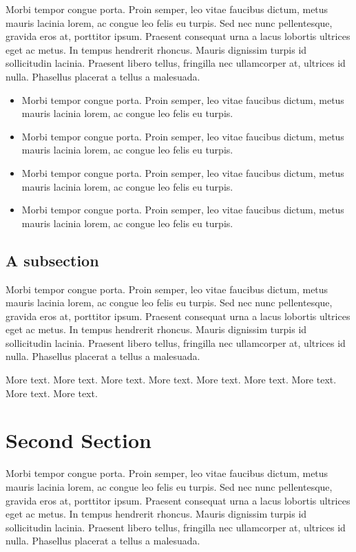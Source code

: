 \documentclass[11pt,titlepage,twoside,openright]{report}
\begin{document}
Morbi tempor congue porta. Proin semper, leo vitae faucibus dictum, metus mauris lacinia lorem, ac congue leo felis eu turpis. Sed nec nunc pellentesque, gravida eros at, porttitor ipsum. Praesent consequat urna a lacus lobortis ultrices eget ac metus. In tempus hendrerit rhoncus. Mauris dignissim turpis id sollicitudin lacinia. Praesent libero tellus, fringilla nec ullamcorper at, ultrices id nulla. Phasellus placerat a tellus a malesuada.

\begin{itemize}
	\item Morbi tempor congue porta. Proin semper, leo vitae faucibus dictum, metus mauris lacinia lorem, ac congue leo felis eu turpis. 
	\item Morbi tempor congue porta. Proin semper, leo vitae faucibus dictum, metus mauris lacinia lorem, ac congue leo felis eu turpis. 
	\item Morbi tempor congue porta. Proin semper, leo vitae faucibus dictum, metus mauris lacinia lorem, ac congue leo felis eu turpis. 
	\item Morbi tempor congue porta. Proin semper, leo vitae faucibus dictum, metus mauris lacinia lorem, ac congue leo felis eu turpis. 
\end{itemize}

\subsection[1st Subsection Name]{A subsection}

Morbi tempor congue porta. Proin semper, leo vitae faucibus dictum, metus mauris lacinia lorem, ac congue leo felis eu turpis. Sed nec nunc pellentesque, gravida eros at, porttitor ipsum. Praesent consequat urna a lacus lobortis ultrices eget ac metus. In tempus hendrerit rhoncus. Mauris dignissim turpis id sollicitudin lacinia. Praesent libero tellus, fringilla nec ullamcorper at, ultrices id nulla. Phasellus placerat a tellus a malesuada.

More text. More text. More text.  More text. More text. More text. More text. More text. More text. 

\cleardoublepage

\section[2nd Section Name]{Second Section}

Morbi tempor congue porta. Proin semper, leo vitae faucibus dictum, metus mauris lacinia lorem, ac congue leo felis eu turpis. Sed nec nunc pellentesque, gravida eros at, porttitor ipsum. Praesent consequat urna a lacus lobortis ultrices eget ac metus. In tempus hendrerit rhoncus. Mauris dignissim turpis id sollicitudin lacinia. Praesent libero tellus, fringilla nec ullamcorper at, ultrices id nulla. Phasellus placerat a tellus a malesuada.
\end{document}
